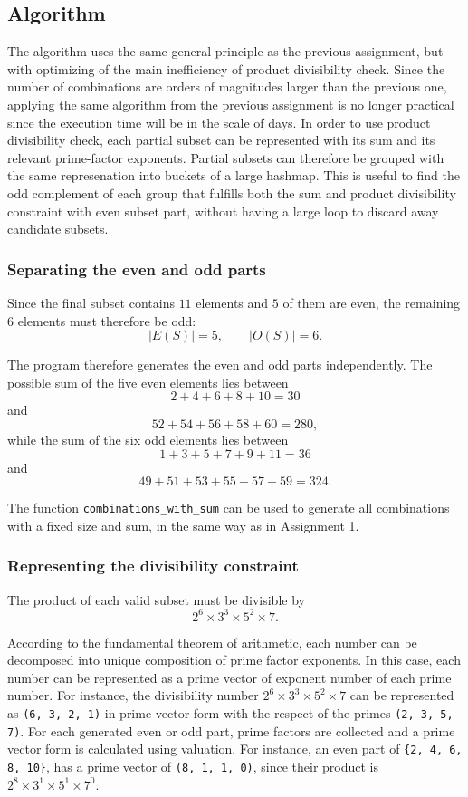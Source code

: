 \documentclass[11pt,a4paper]{article}
\begin{document}
\subsection*{Algorithm}

The algorithm uses the same general principle as the previous assignment, but with optimizing of the main inefficiency of product divisibility check. Since the number of combinations are orders of magnitudes larger than the previous one, applying the same algorithm from the previous assignment is no longer practical since the execution time will be in the scale of days. In order to use product divisibility check, each partial subset can be represented with its sum and its relevant prime-factor exponents. Partial subsets can therefore be grouped with the same represenation into buckets of a large hashmap. This is useful to find the odd complement of each group that fulfills both the sum and product divisibility constraint with even subset part, without having a large loop to discard away candidate subsets.

\subsubsection*{Separating the even and odd parts}

Since the final subset contains $11$ elements and $5$ of them are even, the remaining $6$ elements must therefore be odd:
\[
|E(S)|=5,\qquad |O(S)|=6.
\]

The program therefore generates the even and odd parts independently. The possible sum of the five even elements lies between
\[
2+4+6+8+10=30
\]
and
\[
52+54+56+58+60=280,
\]
while the sum of the six odd elements lies between
\[
1+3+5+7+9+11=36
\]
and
\[
49+51+53+55+57+59=324.
\]

The function \texttt{combinations\_with\_sum} can be used to generate all combinations with a fixed size and sum, in the same way as in Assignment 1.

\subsubsection*{Representing the divisibility constraint}

The product of each valid subset must be divisible by
\[
2^6\times3^3\times5^2\times7.
\]

According to the fundamental theorem of arithmetic, each number can be decomposed into unique composition of prime factor exponents. In this case, each number can be represented as a prime vector of exponent number of each prime number. For instance, the divisibility number $2^6\times3^3\times5^2\times7$ can be represented as \texttt{(6, 3, 2, 1)} in prime vector form with the respect of the primes \texttt{(2, 3, 5, 7)}. For each generated even or odd part, prime factors are collected and a prime vector form is calculated using valuation. For instance, an even part of \texttt{\{2, 4, 6, 8, 10\}}, has a prime vector of \texttt{(8, 1, 1, 0)}, since their product is $2^8 \times 3^1 \times 5^1 \times 7^0$.
\end{document}
